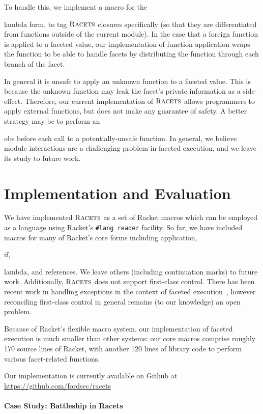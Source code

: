 \documentclass[review=true,acmlarge]{acmart}
\newcommand*{\SavedLstInline}{}
\DeclareRobustCommand*{\lstinline}{%
  \ifmmode
    \let\SavedBGroup\bgroup
    \def\bgroup{%
      \let\bgroup\SavedBGroup
      \hbox\bgroup
    }%
  \fi
  \SavedLstInline
}
\newcommand{\colorMATH}{black!20!blue}
\newcommand{\blue}[1] {{\color{\colorMATH} #1}}
\newcommand{\code}[1]{\lstinline{#1}}
\newcommand{\racets}[0]{$\textsc{Racets}$\xspace}
\begin{document}
To handle this, we implement a macro for the \code{lambda} form, to
tag \racets closures specifically (so that they are differentiated from
functions outside of the current module). In the case that a foreign
function is applied to a faceted value, our implementation of function
application wraps the function to be able to handle facets by
distributing the function through each branch of the facet.

In general it is unsafe to apply an unknown function to a faceted
value. This is because the unknown function may leak the facet's
private information as a side-effect. Therefore, our current
implementation of \racets allows programmers to apply external
functions, but does not make any guarantee of safety. A better
strategy may be to perform an \code{obs} before each call to a
potentially-unsafe function. In general, we believe module
interactions are a challenging problem in faceted execution, and we
leave its study to future work.

\section{Implementation and Evaluation}

We have implemented \racets as a set of Racket macros which can be
employed as a language using Racket's \texttt{\#lang reader}
facility. So far, we have included macros for many of Racket's core
forms including application, \code{if}, \code{lambda}, and
references. We leave others (including continuation marks) to future
work. Additionally, \racets does not support first-class control. There
has been recent work in handling exceptions in the context of faceted
execution~\cite{Austin:17}, however reconciling first-class control in
general remains (to our knowledge) an open problem.

Because of Racket's flexible macro system, our implementation of
faceted execution is much smaller than other systems: our core macros
comprise roughly 170 source lines of Racket, with another 120 lines of
library code to perform various facet-related functions.

Our implementation is currently available on Github at
\blue{\url{https://github.com/fordsec/racets}}

\paragraph*{Case Study: Battleship in Racets}
\end{document}
